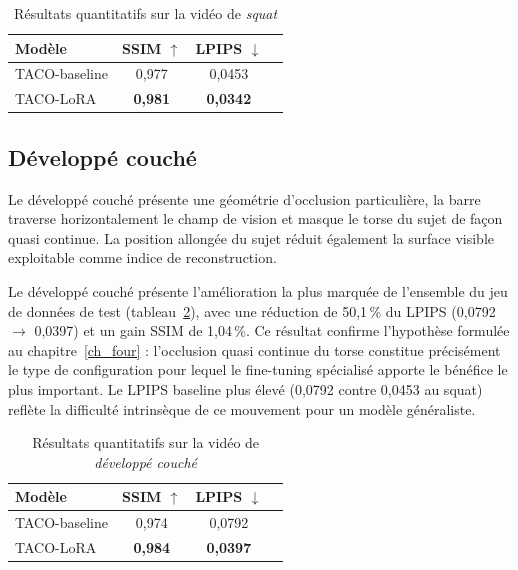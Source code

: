 \begin{table}[h]
  \centering
  \begin{tabular}{lccc}
    \hline
    \textbf{Modèle} & \textbf{SSIM} $\uparrow$ & \textbf{LPIPS} $\downarrow$ \\
    \hline
    TACO-baseline          & 0,977 & 0,0453 \\
    TACO-LoRA & \textbf{0,981} & \textbf{0,0342} \\
    \hline
  \end{tabular}
  \caption{Résultats quantitatifs sur la vidéo de \emph{squat}}
  \label{tab:resultats-squat}
\end{table}

\subsection{Développé couché} \label{sec:resultats-bench}

Le développé couché présente une géométrie d'occlusion particulière, la barre traverse horizontalement le champ de vision et masque le torse du sujet de façon quasi continue. La position allongée du sujet réduit également la surface visible exploitable comme indice de reconstruction.

Le développé couché présente l'amélioration la plus marquée de l'ensemble du jeu de données de test (tableau~\ref{tab:resultats-bench}), avec une réduction de 50,1\,\% du LPIPS (0,0792 $\rightarrow$ 0,0397) et un gain SSIM de 1,04\,\%. Ce résultat confirme l'hypothèse formulée au chapitre~\ref{ch_four} : l'occlusion quasi continue du torse constitue précisément le type de configuration pour lequel le fine-tuning spécialisé apporte le bénéfice le plus important. Le LPIPS baseline plus élevé (0,0792 contre 0,0453 au squat) reflète la difficulté intrinsèque de ce mouvement pour un modèle généraliste.

\begin{table}[h]
  \centering
  \begin{tabular}{lccc}
    \hline
    \textbf{Modèle} & \textbf{SSIM} $\uparrow$ & \textbf{LPIPS} $\downarrow$ \\
    \hline
    TACO-baseline          & 0,974 & 0,0792 \\
    TACO-LoRA & \textbf{0,984} & \textbf{0,0397} \\
    \hline
  \end{tabular}
  \caption{Résultats quantitatifs sur la vidéo de \emph{développé couché}}
  \label{tab:resultats-bench}
\end{table}

